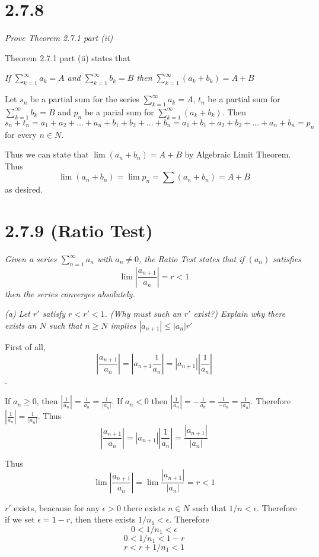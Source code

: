 \documentclass[11pt,oneside,titlepage]{article}
\begin{document}
\section*{2.7.8}
\textit{Prove Theorem 2.7.1 part (ii)}

Theorem 2.7.1 part (ii) states that

\textit{If $\sum_{k = 1}^{\infty} a_k = A$ and $\sum_{k = 1}^{\infty} b_k = B$
then $\sum_{k = 1}^{\infty} (a_k + b_k) = A + B$}

Let $s_n$ be a partial sum for the series $\sum_{k = 1}^{\infty} a_k = A$,
$t_n$ be a partial sum for $\sum_{k = 1}^{\infty} b_k = B$ and
$p_n$ be a parial sum for $\sum_{k = 1}^{\infty} (a_k + b_k)$. Then
$$s_n + t_n = a_1 + a_2 + ... + a_n + b_1 + b_2 + ... + b_n =
a_1 + b_1 + a_2 + b_2 + ... + a_n + b_n = p_n $$
for every $n \in N$. 

Thus we can state that $\lim (a_n + b_n) = A + B$ by Algebraic Limit Theorem.
Thus 
$$\lim (a_n + b_n) = \lim p_n = \sum (a_n + b_n) = A + B$$
as desired.

\section*{2.7.9 (Ratio Test)}
\textit{Given a series $\sum_{n = 1}^{\infty} a_n$ with $a_n \neq 0$, the
  Ratio Test states that if $(a_n)$ satisfies}
$$\lim|\frac{a_{n + 1}}{a_n}| = r < 1$$
\textit{then the series converges absolutely.}

\textit{(a) Let $r'$ satisfy $r < r' < 1$. (Why must such an $r'$ exist?)
  Explain why there exists an $N$ such that $n \geq N$ implies
  $|a_{n + 1}| \leq |a_n|r'$}

First of all,
$$|\frac{a_{n + 1}}{a_n}| = |a_{n + 1} \frac{1}{a_n}| =  |a_{n + 1}| |\frac{1}{a_n}|$$.

If  $a_n \geq 0$, then $|\frac{1}{a_n}| = \frac{1}{a_n} = \frac{1}{|a_n|}$.
If $a_n < 0$ then $|\frac{1}{a_n}| = - \frac{1}{a_n} = \frac{1}{-a_n} =
\frac{1}{|a_n|}$. Therefore $|\frac{1}{a_n}| = \frac{1}{|a_n|}$. Thus 
$$|\frac{a_{n + 1}}{a_n}| = |a_{n + 1}| |\frac{1}{a_n}| =
\frac{|a_{n + 1}|}{|a_n|}$$

Thus
$$\lim|\frac{a_{n + 1}}{a_n}| = \lim\frac{|a_{n + 1}|}{|a_n|} = r < 1$$

$r'$ exists, beacause for any $\epsilon > 0$ there exists $n \in N$ such that
$1/n < \epsilon$. Therefore if we set $\epsilon = 1 - r$, then there exists
$1/n_1 < \epsilon$. Therefore
$$0 < 1/n_1 < \epsilon$$
$$0 < 1/n_1 < 1 - r$$
$$r < r + 1/n_1 < 1$$
\end{document}
